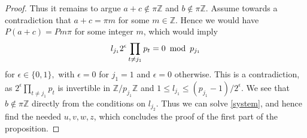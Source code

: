 \begin{proof}
 Thus it remains to argue $a+c \notin \pi \mathbb{Z}$ and $ b \notin \pi\mathbb{Z}.$ Assume towards a contradiction that $a+c =\pi m$ for some $m \in \mathbb{Z}.$ Hence we would have $P(a+c)=Pm\pi$ for some integer $m$, which would imply 
 \begin{equation}
 l_{j_1} 2^{\epsilon} \prod_{t\not=j_1} p_t = 0 \ \operatorname{mod} \ p_{j_1}
 \end{equation}
 for $\epsilon \in \{0,1\},$ with $\epsilon =0$ for $j_1=1$ and $\epsilon=0$ otherwise. This is a contradiction, as $2^{\epsilon} \prod_{t\not=j_1} p_t$ is invertible in $\mathbb{Z}/p_{j_1} \mathbb{Z}$ and $1\leq l_{j_1} \leq (p_{j_1}-1)/2^{\epsilon}.$ We see that $b\notin \pi \mathbb{Z}$ directly from the conditions on $l_{j_2}$. Thus we can solve \eqref{system}, and hence find the needed $u,v,w,z$, which concludes the proof of the first part of the proposition.
 

\end{proof}
